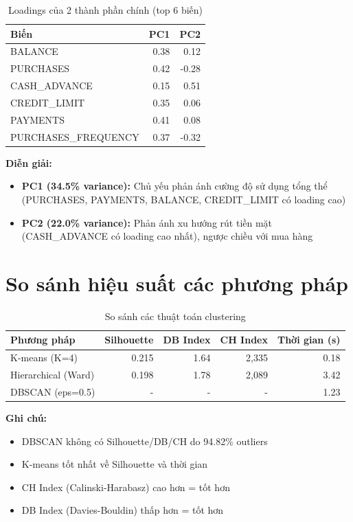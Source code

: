 \begin{table}[H]
\centering
\caption{Loadings của 2 thành phần chính (top 6 biến)}
\begin{tabular}{|l|r|r|}
\hline
\textbf{Biến} & \textbf{PC1} & \textbf{PC2} \\
\hline
BALANCE & 0.38 & 0.12 \\
\hline
PURCHASES & 0.42 & -0.28 \\
\hline
CASH\_ADVANCE & 0.15 & 0.51 \\
\hline
CREDIT\_LIMIT & 0.35 & 0.06 \\
\hline
PAYMENTS & 0.41 & 0.08 \\
\hline
PURCHASES\_FREQUENCY & 0.37 & -0.32 \\
\hline
\end{tabular}
\end{table}

\textbf{Diễn giải:}
\begin{itemize}
    \item \textbf{PC1 (34.5\% variance):} Chủ yếu phản ánh cường độ sử dụng tổng thể (PURCHASES, PAYMENTS, BALANCE, CREDIT\_LIMIT có loading cao)
    \item \textbf{PC2 (22.0\% variance):} Phản ánh xu hướng rút tiền mặt (CASH\_ADVANCE có loading cao nhất), ngược chiều với mua hàng
\end{itemize}

\section{So sánh hiệu suất các phương pháp}

\begin{table}[H]
\centering
\caption{So sánh các thuật toán clustering}
\begin{tabular}{|l|r|r|r|r|}
\hline
\textbf{Phương pháp} & \textbf{Silhouette} & \textbf{DB Index} & \textbf{CH Index} & \textbf{Thời gian (s)} \\
\hline
K-means (K=4) & 0.215 & 1.64 & 2,335 & 0.18 \\
\hline
Hierarchical (Ward) & 0.198 & 1.78 & 2,089 & 3.42 \\
\hline
DBSCAN (eps=0.5) & - & - & - & 1.23 \\
\hline
\end{tabular}
\end{table}

\textbf{Ghi chú:} 
\begin{itemize}
    \item DBSCAN không có Silhouette/DB/CH do 94.82\% outliers
    \item K-means tốt nhất về Silhouette và thời gian
    \item CH Index (Calinski-Harabasz) cao hơn = tốt hơn
    \item DB Index (Davies-Bouldin) thấp hơn = tốt hơn
\end{itemize}
